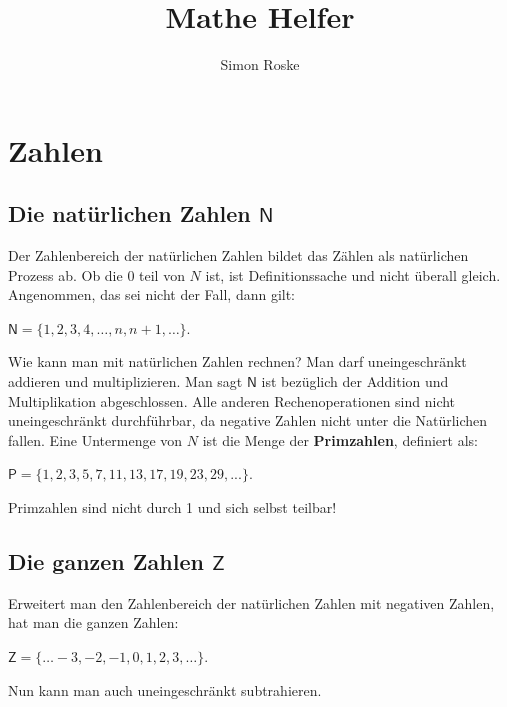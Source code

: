 \documentclass[letterpaper, titlepage]{article}
\author{Simon Roske}
\title{Mathe Helfer}
\begin{document}
\maketitle

\tableofcontents
\listoffigures

\newpage

\newcommand{\skiptwolines}{
    \newline %
    \newline %
}

\newcommand{\skiptwolineswithcenteredexpr}[1]{
    \vspace{\baselineskip} %
    \begin{center}
        #1 %
    \end{center}
    \vspace{\baselineskip} %
}

\newcommand{\absatzformel}{
    \hfill
    \break
}

\section{Zahlen}\label{Zahlen}


\subsection{Die natürlichen Zahlen $\mathsf{N}$}\label{Die natürlichen Zahlen}
Der Zahlenbereich der natürlichen Zahlen bildet das Zählen als natürlichen Prozess ab. Ob die 0 teil von $N$ ist, ist Definitionssache und nicht überall gleich. Angenommen, das sei nicht der Fall, dann gilt:
\skiptwolineswithcenteredexpr{$\mathsf{N}=\{1,2,3,4,…,n,n+1,…\}$.}
Wie kann man mit natürlichen Zahlen rechnen? Man darf uneingeschränkt addieren und multiplizieren. Man sagt $\mathsf{N}$ ist bezüglich der Addition und Multiplikation abgeschlossen. Alle anderen Rechenoperationen sind nicht uneingeschränkt durchführbar, da negative Zahlen nicht unter die Natürlichen fallen. Eine Untermenge von $N$ ist die Menge der \textbf{Primzahlen}, definiert als: 
\skiptwolineswithcenteredexpr{$\mathsf{P}=\{1,2,3,5,7,11,13,17,19,23,29,...\}$.}
Primzahlen sind nicht durch 1 und sich selbst teilbar!

\subsection{Die ganzen Zahlen $\mathsf{Z}$}\label{Die ganzen Zahlen}
Erweitert man den Zahlenbereich der natürlichen Zahlen mit negativen Zahlen, hat man die ganzen Zahlen: 
\skiptwolineswithcenteredexpr{$\mathsf{Z}=\{…-3,-2,-1,0,1,2,3,…\}$.}
Nun kann man auch uneingeschränkt subtrahieren.
\end{document}
